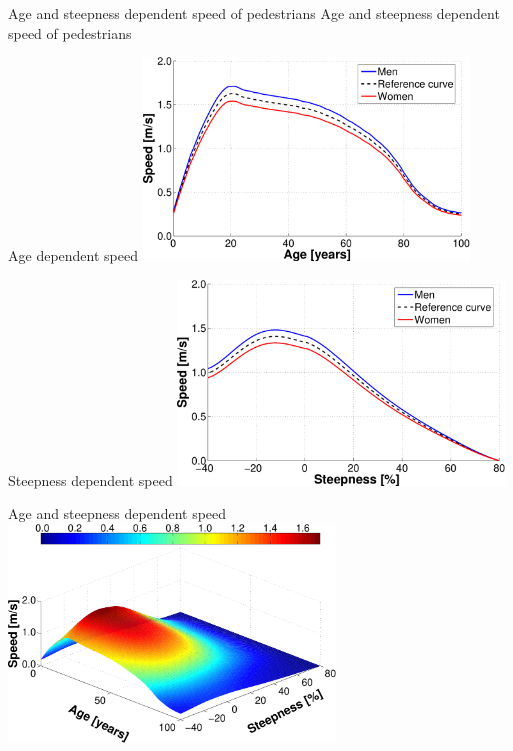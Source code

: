 \createfigure%
{Age and steepness dependent speed of pedestrians}%
{Age and steepness dependent speed of pedestrians}%
{\label{fig:labelWalkTravelTimes}}%
{%
  \createsubfigure%
  {Age dependent speed}%
  {\includegraphics[width=0.65\textwidth, angle=0]{extending/figures/MultiModalSimulation/pedestriansAge}}%
  {\label{fig:labelPedestriansAge}}%
  {\vspace{3mm}}%

  \createsubfigure%
  {Steepness dependent speed}%
  {\includegraphics[width=0.65\textwidth, angle=0]{extending/figures/MultiModalSimulation/pedestriansSteepness}}%
  {\label{fig:labelPedestriansSteepness}}%
  {\vspace{3mm}}%

  \createsubfigure%
  {Age and steepness dependent speed}%
  {\includegraphics[width=0.65\textwidth, angle=0]{extending/figures/MultiModalSimulation/pedestrians3d}}%
  {\label{fig:labelPedestriansAgeSteepness3d}}%
  {}%
}%
{}

